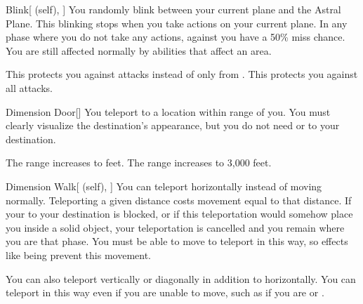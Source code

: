 \lowercase{\hypertarget{spell:Blink}{}}\label{spell:Blink}
\begin{attuneability}[Rank 4]{\hypertarget{spell:Blink}{Blink}}[ (self), ]
You randomly blink between your current plane and the Astral Plane.
This blinking stops when you take actions on your current plane.
In any phase where you do not take any actions,   against you have a 50\% miss chance.
You are still affected normally by abilities that affect an area.

\rankline
{} This protects you against   attacks instead of only from .
 This protects you against all  attacks.
\end{attuneability}
\vspace{0.25em}



\lowercase{\hypertarget{spell:Dimension Door}{}}\label{spell:Dimension Door}
\begin{freeability}[Rank 4]{\hypertarget{spell:Dimension Door}{Dimension Door}}[]
You teleport to a location within \rnglong range of you.
You must clearly visualize the destination's appearance, but you do not need  or  to your destination.

\rankline
{} The range increases to \rngext feet.
 The range increases to 3,000 feet.
\end{freeability}
\vspace{0.25em}



\lowercase{\hypertarget{spell:Dimension Walk}{}}\label{spell:Dimension Walk}
\begin{attuneability}[Rank 4]{\hypertarget{spell:Dimension Walk}{Dimension Walk}}[ (self), ]
You can teleport horizontally instead of moving normally.
Teleporting a given distance costs movement equal to that distance.
If your  to your destination is blocked, or if this teleportation would somehow place you inside a solid object, your teleportation is cancelled and you remain where you are that phase.
You must be able to move to teleport in this way, so effects like being  prevent this movement.

\rankline
{} You can also teleport vertically or diagonally in addition to horizontally.
 You can teleport in this way even if you are unable to move, such as if you are  or .
\end{attuneability}
\vspace{0.25em}



